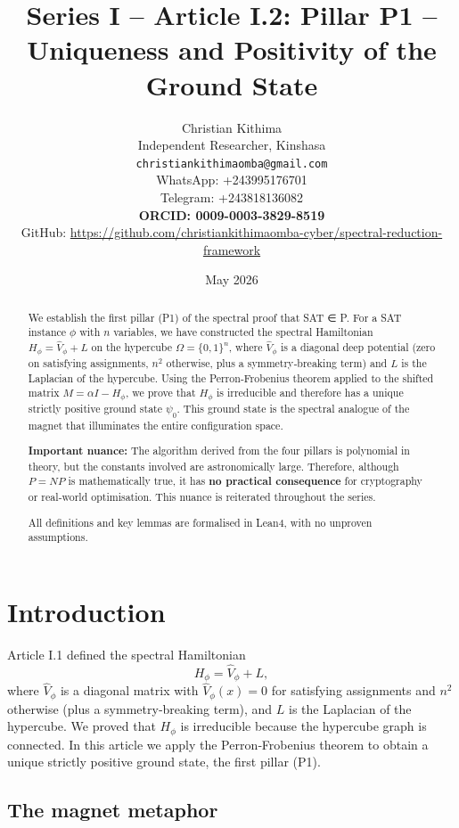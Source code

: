 \documentclass[11pt,a4paper]{article}
\title{Series I – Article I.2: Pillar P1 – Uniqueness and Positivity of the Ground State}
\author{Christian Kithima \\
Independent Researcher, Kinshasa \\
\texttt{christiankithimaomba@gmail.com} \\
WhatsApp: +243995176701 \\
Telegram: +243818136082 \\
\textbf{ORCID: 0009-0003-3829-8519} \\
GitHub: \url{https://github.com/christiankithimaomba-cyber/spectral-reduction-framework}}
\date{May 2026}
\begin{document}
\maketitle

\begin{abstract}
We establish the first pillar (P1) of the spectral proof that SAT ∈ P. For a SAT instance $\phi$ with $n$ variables, we have constructed the spectral Hamiltonian $H_\phi = \hat{V}_\phi + L$ on the hypercube $\Omega = \{0,1\}^n$, where $\hat{V}_\phi$ is a diagonal deep potential (zero on satisfying assignments, $n^2$ otherwise, plus a symmetry‑breaking term) and $L$ is the Laplacian of the hypercube. Using the Perron‑Frobenius theorem applied to the shifted matrix $M = \alpha I - H_\phi$, we prove that $H_\phi$ is irreducible and therefore has a unique strictly positive ground state $\psi_0$. This ground state is the spectral analogue of the magnet that illuminates the entire configuration space.

\textbf{Important nuance:} The algorithm derived from the four pillars is polynomial in theory, but the constants involved are astronomically large. Therefore, although $P = NP$ is mathematically true, it has \textbf{no practical consequence} for cryptography or real‑world optimisation. This nuance is reiterated throughout the series.

All definitions and key lemmas are formalised in Lean4, with no unproven assumptions.
\end{abstract}

\tableofcontents

\section{Introduction}

Article I.1 defined the spectral Hamiltonian
\[
H_\phi = \hat{V}_\phi + L,
\]
where $\hat{V}_\phi$ is a diagonal matrix with $\hat{V}_\phi(x)=0$ for satisfying assignments and $n^2$ otherwise (plus a symmetry‑breaking term), and $L$ is the Laplacian of the hypercube. We proved that $H_\phi$ is irreducible because the hypercube graph is connected. In this article we apply the Perron‑Frobenius theorem to obtain a unique strictly positive ground state, the first pillar (P1).

\subsection{The magnet metaphor}
\end{document}
